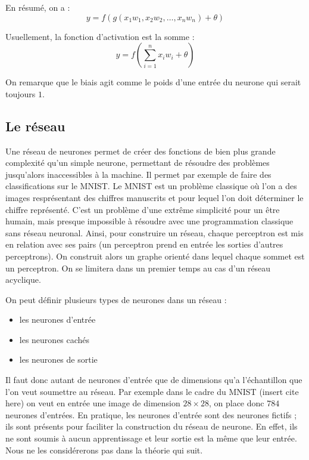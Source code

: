 \medskip

En résumé, on a :
\[y = f(g(x_1w_1, x_2w_2, \ldots , x_nw_n) + \theta) \]

\medskip

Usuellement, la fonction d'activation est la somme :
\[y = f(\sum_{i=1}^n x_iw_i + \theta) \]

\medskip

On remarque que le biais agit comme le poids d'une entrée du neurone qui serait
toujours $1$.

\subsection{Le réseau}

Une réseau de neurones permet de créer des fonctions de bien plus grande
complexité qu'un simple neurone, permettant de résoudre des problèmes
jusqu'alors inaccessibles à la machine. Il permet par exemple de faire des
classifications sur le MNIST. Le MNIST est un problème classique où l'on a des
images resprésentant des chiffres manuscrits et pour lequel l'on doit déterminer
 le chiffre représenté. C'est un problème d'une extrême simplicité pour un être
 humain, mais presque impossible à résoudre avec une programmation classique
sans réseau neuronal. Ainsi, pour construire un réseau, chaque perceptron est
mis en relation avec ses pairs (un perceptron prend en entrée les sorties
d'autres perceptrons). On construit alors un graphe orienté dans lequel chaque
sommet est un perceptron. On se limitera dans un premier temps au cas d'un
réseau acyclique.

\bigskip

On peut définir plusieurs types de neurones dans un réseau :
\begin{itemize}
\item les neurones d'entrée
\item les neurones cachés
\item les neurones de sortie
\end{itemize}

\bigskip

Il faut donc autant de neurones d'entrée que de dimensions qu'a l'échantillon
que l'on veut soumettre au réseau. Par exemple dans le cadre du MNIST (insert cite here)
on veut en entrée une image de dimension $28 \times 28$, on place donc $784$
neurones d'entrées. En pratique, les neurones d'entrée sont des neurones fictifs
; ils sont présents pour faciliter la construction du réseau de neurone.
En effet, ils ne sont soumis à aucun apprentissage et leur sortie est la même
que leur entrée. Nous ne les considérerons pas dans la théorie qui suit.

